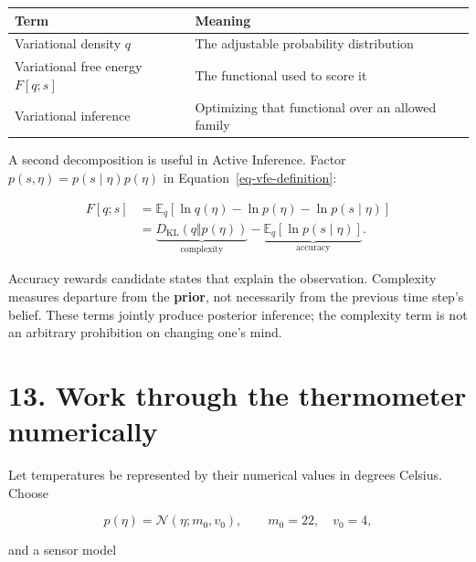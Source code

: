 \documentclass[
  letterpaper,
  DIV=11,
  numbers=noendperiod]{scrreprt}
\newcounter{none} %
\begin{document}
{\def\LTcaptype{none} %
\begin{longtable}[]{@{}
  >{\raggedright\arraybackslash}p{}
  >{\raggedright\arraybackslash}p{}@{}}
\toprule\noalign{}
\begin{minipage}[b]{\linewidth}\raggedright
Term
\end{minipage} & \begin{minipage}[b]{\linewidth}\raggedright
Meaning
\end{minipage} \\
\midrule\noalign{}
\endhead
\bottomrule\noalign{}
\endlastfoot
Variational density \(q\) & The adjustable probability distribution \\
Variational free energy \(F[q;s]\) & The functional used to score it \\
Variational inference & Optimizing that functional over an allowed
family \\
\end{longtable}
}

A second decomposition is useful in Active Inference. Factor
\(p(s,\eta)=p(s\mid\eta)p(\eta)\) in Equation~\ref{eq-vfe-definition}:

\[
\begin{aligned}
F[q;s]
&=\mathbb E_q[\ln q(\eta)-\ln p(\eta)-\ln p(s\mid\eta)]\\
&=\underbrace{D_{\mathrm{KL}}(q\Vert p(\eta))}_{\text{complexity}}
-\underbrace{\mathbb E_q[\ln p(s\mid\eta)]}_{\text{accuracy}}.
\end{aligned}
\]

Accuracy rewards candidate states that explain the observation.
Complexity measures departure from the \textbf{prior}, not necessarily
from the previous time step's belief. These terms jointly produce
posterior inference; the complexity term is not an arbitrary prohibition
on changing one's mind.

\section{13. Work through the thermometer
numerically}\label{work-through-the-thermometer-numerically}

Let temperatures be represented by their numerical values in degrees
Celsius. Choose

\[
p(\eta)=\mathcal N(\eta;m_0,v_0),
\qquad m_0=22,\quad v_0=4,
\]

and a sensor model
\end{document}
